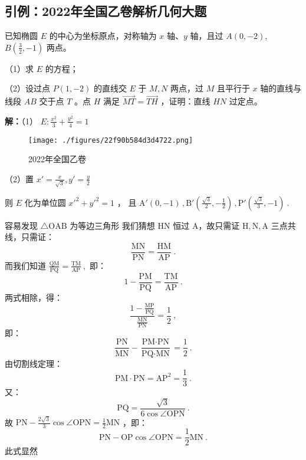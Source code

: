 \begin{issues}
\end{issues}

\subsection{引例：2022年全国乙卷解析几何大题}

已知椭圆 $\displaystyle{E}$ 的中心为坐标原点，对称轴为 $\displaystyle{x}$ 轴、$\displaystyle{y}$ 轴，且过 $\displaystyle{A(0,-2)}$,$\displaystyle{B\left(\frac{3}{2},-1\right)}$ 两点。

（1）求 $\displaystyle{E}$ 的方程；

（2）设过点 $\displaystyle{P(1,-2)}$ 的直线交 $\displaystyle{E}$ 于 $\displaystyle{M,N}$ 两点，过 $\displaystyle{M}$ 且平行于 $\displaystyle{x}$ 轴的直线与线段 $\displaystyle{AB}$ 交于点 $\displaystyle{T}$ 。点 $\displaystyle{H}$ 满足 $\displaystyle{\overrightarrow{MT}=\overrightarrow{TH}}$ ，证明：直线 $\displaystyle{HN}$ 过定点。

\textbf{解：}（1） $\displaystyle{E:\frac{x^2}{3}+\frac{y^2}{4}=1}$
\begin{figure}[ht]
\centering
\texttt{[image: ./figures/22f90b584d3d4722.png]}
\caption{2022年全国乙卷} \label{fig_affine_13}
\end{figure}
（2）置 $\displaystyle{x'=\frac{x}{\sqrt{3}},y'=\frac{y}{2}}$

则 $\displaystyle{E}$ 化为单位圆 $\displaystyle{x'^2+y'^2=1}$ ， 且 $\displaystyle{\text{A}'(0,-1)\,,\text{B}'\left(\frac{\sqrt{3}}{2},-\frac{1}{2}\right)\,,\text{P}'\left(\frac{\sqrt{3}}{3},-1\right)}~.$

容易发现 $\displaystyle{\triangle \text{OAB}}$ 为等边三角形
我们猜想 $\displaystyle{\text{HN}}$ 恒过 $\displaystyle{\text{A}}$，故只需证 $\displaystyle{\text{H},\text{N},\text{A}}$ 三点共线，只需证：
$$\frac{\text{MN}}{\text{PN}}=\frac{\text{HM}}{\text{AP}}~.$$
而我们知道 $\displaystyle{\frac{\text{QM}}{\text{PQ}}=\frac{\text{TM}}{\text{AP}}}~,$ 
即：
$$1-\frac{\text{PM}}{\text{PQ}}=\frac{\text{TM}}{\text{AP}}~.$$
两式相除，得：
$$\frac{1-\frac{\text{MP}}{\text{PQ}}}{\frac{\text{MN}}{\text{PN}}}=\frac{1}{2}~,$$
即：
$$\frac{\text{PN}}{\text{MN}}-\frac{\text{PM}\cdot\text{PN}}{\text{PQ}\cdot\text{MN}}=\frac{1}{2}~.$$
由切割线定理：
$${\text{PM}}\cdot{\text{PN}}=\text{AP}^2=\frac{1}3~.$$
又：
$$\text{PQ}=\frac{\sqrt{3}}{6\cos\angle\text{OPN}}~.$$
故 $\displaystyle{\text{PN}-\frac{2\sqrt{3}}{3}\cos\angle\text{OPN}=\frac{1}{2}\text{MN}}$ ，即：
$$\text{PN}-\text{OP}\cos\angle\text{OPN}=\frac{1}{2}\text{MN}~.$$
此式显然
